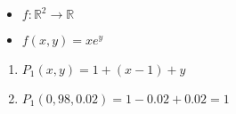 \documentclass[../practica_05.tex]{subfiles}
\begin{document}
    \begin{itemize}
        \item $f: \mathbb{R}^2 \to \mathbb{R}$
        \item $f(x,y) = xe^y$
    \end{itemize}

    \begin{enumerate}
        \item $P_1(x,y) = 1 + (x-1) + y$
        \item $P_1(0,98, 0.02) = 1 - 0.02 + 0.02 = 1$
    \end{enumerate}
\end{document}
